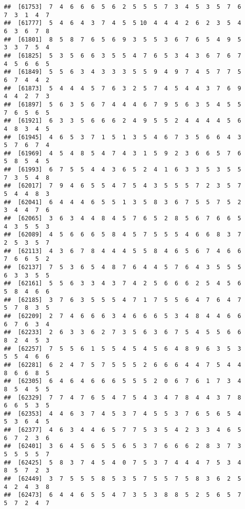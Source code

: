 \documentclass[
]{book}
\begin{document}
\begin{verbatim}
##  [61753]  7  4  6  6  6  5  6  2  5  5  5  7  3  4  5  3  5  7  6  7  3  1  4  7
##  [61777]  5  4  6  4  3  7  4  5  5 10  4  4  4  2  6  2  3  5  4  6  3  6  7  8
##  [61801]  8  5  8  7  6  5  6  9  3  5  5  3  6  7  6  5  4  9  5  3  3  7  5  4
##  [61825]  5  3  5  6  6  3  5  5  4  7  6  5  3  4  3  6  7  6  7  4  5  6  6  5
##  [61849]  5  5  6  3  4  3  3  3  5  5  9  4  9  7  4  5  7  7  5  6  7  4  4  2
##  [61873]  5  4  4  4  5  7  6  3  2  5  7  4  5  4  4  3  7  6  9  4  4  2  7  3
##  [61897]  5  6  3  5  6  7  4  4  4  6  7  9  5  6  3  5  4  5  5  7  6  5  6  5
##  [61921]  6  3  3  5  6  6  6  2  4  9  5  5  2  4  4  4  4  5  6  4  8  3  4  5
##  [61945]  4  6  5  3  7  1  5  1  3  5  4  6  7  3  5  6  6  4  3  5  7  6  7  4
##  [61969]  4  5  4  8  5  4  7  4  3  1  5  9  2  3  6  6  5  7  6  5  8  5  4  5
##  [61993]  6  7  5  5  4  4  3  6  5  2  4  1  6  3  3  5  3  5  5  7  3  5  4  8
##  [62017]  7  9  4  6  5  5  4  7  5  4  3  5  5  5  7  2  3  5  7  5  4  4  8  3
##  [62041]  6  4  4  4  6  5  5  1  3  5  8  3  6  7  5  5  7  5  2  3  4  4  7  6
##  [62065]  3  6  3  4  4  8  4  5  7  6  5  2  8  5  6  7  6  6  5  4  3  5  5  3
##  [62089]  4  5  6  6  6  5  8  4  5  7  5  5  5  4  6  6  8  3  7  2  5  3  5  7
##  [62113]  4  3  6  7  8  4  4  4  5  5  8  4  6  5  6  7  4  6  6  7  6  6  5  2
##  [62137]  7  5  3  6  5  4  8  7  6  4  4  5  7  6  4  3  5  5  5  6  3  3  5  5
##  [62161]  5  5  6  3  3  4  3  7  4  2  5  6  6  6  2  5  4  5  6  5  8  4  6  6
##  [62185]  3  7  6  3  5  5  5  4  7  1  7  5  5  6  4  7  6  4  7  5  7  8  3  5
##  [62209]  2  7  4  6  6  6  3  4  6  6  6  5  3  4  8  4  4  6  6  6  7  6  3  4
##  [62233]  2  6  3  3  6  2  7  3  5  6  3  6  7  5  4  5  5  6  6  8  2  4  5  3
##  [62257]  7  5  5  6  1  5  5  4  5  4  5  6  4  8  9  6  3  5  3  5  5  4  6  6
##  [62281]  6  2  4  7  5  7  5  5  5  2  6  6  6  4  4  7  5  4  4  8  6  6  8  5
##  [62305]  6  4  6  4  6  6  6  5  5  5  2  0  6  7  6  1  7  3  4  8  5  4  5  5
##  [62329]  7  7  4  7  6  5  4  7  5  4  3  4  7  8  4  4  3  7  8  6  6  5  3  5
##  [62353]  4  4  6  3  7  4  5  3  7  4  5  5  3  7  6  5  6  5  4  5  3  6  4  5
##  [62377]  4  6  3  4  4  6  5  7  7  5  3  5  4  2  3  3  4  6  5  6  7  2  3  6
##  [62401]  3  6  4  5  6  5  5  6  5  3  7  6  6  6  2  8  3  7  3  5  5  5  5  7
##  [62425]  5  8  3  7  4  5  4  0  7  5  3  7  4  4  4  7  5  3  4  8  5  7  2  3
##  [62449]  3  7  5  5  5  8  5  3  5  7  5  5  7  5  8  3  6  2  5  4  2  4  3  8
##  [62473]  6  4  4  6  5  5  4  7  3  5  3  8  8  5  2  5  6  5  7  5  7  2  4  7

\end{verbatim}
\end{document}
